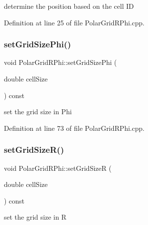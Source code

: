 determine the position based on the cell ID 



Definition at line 25 of file Polar\+Grid\+R\+Phi.\+cpp.

\hypertarget{class_d_d4hep_1_1_geometry_1_1_polar_grid_r_phi_a716334b8d752c594c8f68bcd07b52519}{}\label{class_d_d4hep_1_1_geometry_1_1_polar_grid_r_phi_a716334b8d752c594c8f68bcd07b52519} 
\subsubsection{\texorpdfstring{set\+Grid\+Size\+Phi()}{setGridSizePhi()}}
{\footnotesize\ttfamily void Polar\+Grid\+R\+Phi\+::set\+Grid\+Size\+Phi (\begin{DoxyParamCaption}\item[{double}]{cell\+Size }\end{DoxyParamCaption}) const}



set the grid size in Phi 



Definition at line 73 of file Polar\+Grid\+R\+Phi.\+cpp.

\hypertarget{class_d_d4hep_1_1_geometry_1_1_polar_grid_r_phi_a9ce4b7bd15fc170879e2bfea38c9baf1}{}\label{class_d_d4hep_1_1_geometry_1_1_polar_grid_r_phi_a9ce4b7bd15fc170879e2bfea38c9baf1} 
\subsubsection{\texorpdfstring{set\+Grid\+Size\+R()}{setGridSizeR()}}
{\footnotesize\ttfamily void Polar\+Grid\+R\+Phi\+::set\+Grid\+SizeR (\begin{DoxyParamCaption}\item[{double}]{cell\+Size }\end{DoxyParamCaption}) const}



set the grid size in R 



